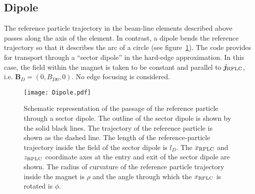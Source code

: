 \subsection{Dipole}

The reference particle trajectory in the beam-line elements described
above passes along the axis of the element.
In contrast, a dipole bends the reference trajectory so that it
describes the arc of a circle (see figure~\ref{fig:Dipole}).
The code provides for transport through a ``sector dipole'' in the
hard-edge approximation. 
In this case, the field within the magnet is taken to be constant and
parallel to $\bm{j}_{\rm RPLC}$, i.e. $\bm{B}_D = (0, B_{D0}, 0)$. 
No edge focusing is considered.
\begin{figure}
  \begin{center}
    \texttt{[image: Dipole.pdf]}
  \end{center}
  \caption{
    Schematic representation of the passage of the reference particle
    through a sector dipole.
    The outline of the sector dipole is shown by the solid black
    lines.
    The trajectory of the reference particle is shown as the dashed
    line.
    The length of the reference-particle trajectory inside the field
    of the sector dipole is $l_D$.
    The $x_{\rm RPLC}$ and $z_{\rm RPLC}$ coordinate axes at the entry
    and exit of the sector dipole are shown.
    The radius of curvature of the reference particle trajectory
    inside the magnet is $\rho$ and the angle through which the
    $x_{\rm RPLC}$ is rotated is $\phi$. 
  }
  \label{fig:Dipole}
\end{figure}

